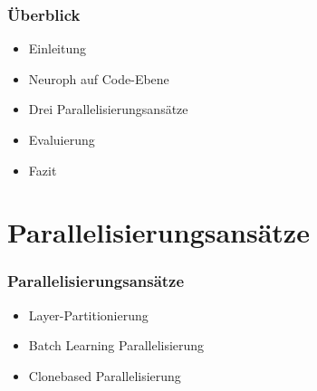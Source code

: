 \documentclass[18pt]{beamer}
\begin{document}
	\begin{frame}[c]\frametitle{Überblick}
		\begin{itemize}
		   \item Einleitung \checkmark
		   \item Neuroph auf Code-Ebene \checkmark
		   \item Drei Parallelisierungsansätze
		   \item Evaluierung
		   \item Fazit
		\end{itemize}
	\end{frame}
	
	\section{Parallelisierungsansätze}
	\begin{frame}[c]\frametitle{Parallelisierungsansätze}
		\begin{itemize}
			\item Layer-Partitionierung
			\item Batch Learning Parallelisierung
			\item Clonebased Parallelisierung
		\end{itemize}	
	\end{frame}
	
\end{document}
